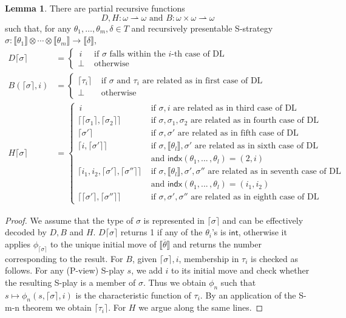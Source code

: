 \documentclass{CSML}
\theoremstyle{definition}\newtheorem{definition}[thm]{Definition}
\theoremstyle{definition}\newtheorem{example}[thm]{Example}
\theoremstyle{definition}\newtheorem{proposition}[thm]{Proposition}
\theoremstyle{definition}\newtheorem{lemma}[thm]{Lemma}
\theoremstyle{definition}\newtheorem{theorem}[thm]{Theorem}
\theoremstyle{definition}\newtheorem{corollary}[thm]{Corollary}
\theoremstyle{definition}\newtheorem{remark}[thm]{Remark}
\newcommand\arr{\rightarrow}
\renewcommand\int{\mathsf{int}}
\newcommand\indx{\mathsf{indx}}
\newcommand\code[1]{\lceil#1\rceil}
\newcommand\sem[1]{\llbracket #1 \rrbracket}
\begin{document}
\begin{lemma}\label{l:DLDL}
There are partial recursive functions
\[ D,H:\omega\rightharpoonup\omega\text{ and }B:\omega\times\omega\rightharpoonup \omega \]
such that, for any $\theta_1,\dots,\theta_m,\delta\in T$ and recursively presentable S-strategy $\sigma:\sem{\theta_1}\otimes\cdots\otimes\sem{\theta_m}\arr\sem{\delta}$,
\begin{align*}
D\code{\sigma}&=\begin{cases}
\,i &\text{ if $\sigma$ falls within the $i$-th case of DL}\\ \bot &\text{ otherwise}
\end{cases}
\\
B(\code{\sigma},i) &= \begin{cases}
\code{\tau_i} &\text{ if $\sigma$ and $\tau_i$ are related as in first case of DL}\\
 \bot &\text{ otherwise}
\end{cases}\\
H\code{\sigma} &=\begin{cases}
\,i &\text{ if $\sigma,i$ are related as in third case of DL}\\
\code{\code{\sigma_1},\code{\sigma_2}} &\text{ if $\sigma,\sigma_1,\sigma_2$ are related as in fourth case of DL}\\
\code{\sigma'} &\text{ if $\sigma,\sigma'$ are related as in fifth case of DL}\\
\code{i,\code{\sigma'}} &\text{ if $\sigma,\sem{\theta_l},\sigma'$ are related as in sixth case of DL}\\
&\text{ and }
\indx(\theta_1,...\,,\theta_{l})=(2,i)
\\	
\code{i_1,i_2,\code{\sigma'},\code{\sigma''}} &\text{ if $\sigma,\sem{\theta_l},\sigma',\sigma''$ are related as in seventh case of DL}\\
&\text{ and }\indx(\theta_1,...\,,\theta_l)=(i_1,i_2)\\	
\code{\code{\sigma'},\code{\sigma''}} &\text{ if $\sigma,\sigma',\sigma''$ are related as in eighth case of DL}
\end{cases}
\end{align*}
\end{lemma}
\begin{proof}
{We assume that the type of $\sigma$ is represented in $\code{\sigma}$ and can be effectively decoded by $D,B$ and $H$.}
$D\code{\sigma}$ returns 1 if any of the $\theta_i$'s is $\int$, otherwise it applies $\phi_{\code{\sigma}}$ to the unique initial move of $\sem{\overline{\theta}}$ and returns the number corresponding to the result. For $B$, given $\code{\sigma},i$, membership in $\tau_i$ is checked as follows. For any (P-view) S-play $s$, we add $i$ to its initial move and check whether the resulting S-play is a member of $\sigma$. Thus we obtain $\phi_n$ such that $s\mapsto\phi_n(s,\code{\sigma},i)$ is the characteristic function of $\tau_i$. By an application of the S-m-n theorem we obtain $\code{\tau_i}$. For $H$ we argue along the same lines. 
\end{proof}
\end{document}
